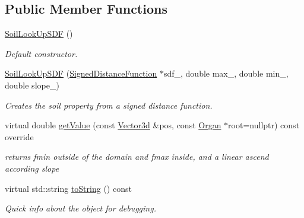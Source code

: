 \subsection*{Public Member Functions}
\begin{DoxyCompactItemize}
\item 
\mbox{\label{classCPlantBox_1_1SoilLookUpSDF_a1aee6c9311fb469ad1e08a41a1e0c7f6}} 
\hyperlink{classCPlantBox_1_1SoilLookUpSDF_a1aee6c9311fb469ad1e08a41a1e0c7f6}{Soil\+Look\+Up\+S\+DF} ()
\begin{DoxyCompactList}\small\item\em Default constructor. \end{DoxyCompactList}\item 
\hyperlink{classCPlantBox_1_1SoilLookUpSDF_a80b63462411e42123e41ead5eb3dd95e}{Soil\+Look\+Up\+S\+DF} (\hyperlink{classCPlantBox_1_1SignedDistanceFunction}{Signed\+Distance\+Function} $\ast$sdf\+\_\+, double max\+\_, double min\+\_, double slope\+\_)
\begin{DoxyCompactList}\small\item\em Creates the soil property from a signed distance function. \end{DoxyCompactList}\item 
virtual double \hyperlink{classCPlantBox_1_1SoilLookUpSDF_a0382e425fc19f70dcc3309db991ef8f5}{get\+Value} (const \hyperlink{classCPlantBox_1_1Vector3d}{Vector3d} \&pos, const \hyperlink{classCPlantBox_1_1Organ}{Organ} $\ast$root=nullptr) const override
\begin{DoxyCompactList}\small\item\em returns fmin outside of the domain and fmax inside, and a linear ascend according slope \end{DoxyCompactList}\item 
\mbox{\label{classCPlantBox_1_1SoilLookUpSDF_a7b6175341de95bf03502b49e1099263a}} 
virtual std\+::string \hyperlink{classCPlantBox_1_1SoilLookUpSDF_a7b6175341de95bf03502b49e1099263a}{to\+String} () const
\begin{DoxyCompactList}\small\item\em Quick info about the object for debugging. \end{DoxyCompactList}\end{DoxyCompactItemize}
